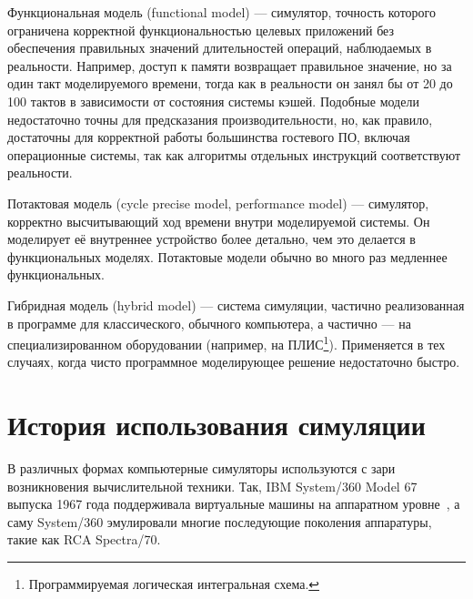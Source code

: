 \begin{description*}
\item[Функциональная модель] (\abbr functional model) --- симулятор, точность которого ограничена корректной функциональностью целевых приложений без обеспечения правильных значений длительностей операций, наблюдаемых в реальности. Например, доступ к памяти возвращает правильное значение, но за один такт моделируемого времени, тогда как в реальности он занял бы от 20 до 100 тактов в зависимости от состояния системы кэшей. Подобные модели недостаточно точны для предсказания производительности, но, как правило, достаточны для корректной работы большинства гостевого ПО, включая операционные системы, так как алгоритмы отдельных инструкций соответствуют реальности.

\item[Потактовая модель] (\abbr cycle precise model, performance model)  --- симулятор, корректно высчитывающий ход времени внутри моделируемой системы. Он моделирует её внутреннее устройство более детально, чем это делается в функциональных моделях. Потактовые модели обычно во много раз медленнее функциональных.

\item[Гибридная модель] (\abbr hybrid model) --- система симуляции, частично реализованная в программе для классического, обычного компьютера, а частично --- на специализированном оборудовании (например, на ПЛИС\footnote{Программируемая логическая интегральная схема.}). Применяется в тех случаях, когда чисто программное моделирующее решение недостаточно быстро.

\end{description*}


\section{История использования симуляции}

В различных формах компьютерные симуляторы используются с зари возникновения вычислительной техники. Так, IBM System/360 Model 67 выпуска 1967 года поддерживала виртуальные машины на аппаратном уровне~\cite{ibm360vm}, а саму System/360 эмулировали многие последующие поколения аппаратуры, такие как RCA Spectra/70.

